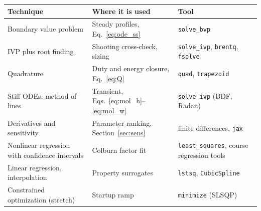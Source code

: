\documentclass[11pt]{article}
\begin{document}
\begin{center}
\small
\begin{tabular}{p{4.6cm} p{5.4cm} p{4.6cm}}
\toprule
Technique & Where it is used & Tool \\
\midrule
Boundary value problem & Steady profiles, Eq.~\eqref{eq:ode_ss} & \texttt{solve\_bvp} \\
IVP plus root finding & Shooting cross-check, sizing & \texttt{solve\_ivp}, \texttt{brentq}, \texttt{fsolve} \\
Quadrature & Duty and energy closure, Eq.~\eqref{eq:Q} & \texttt{quad}, \texttt{trapezoid} \\
Stiff ODEs, method of lines & Transient, Eqs.~\eqref{eq:mol_h}--\eqref{eq:mol_w} & \texttt{solve\_ivp} (BDF, Radau) \\
Derivatives and sensitivity & Parameter ranking, Section~\ref{sec:sens} & finite differences, \texttt{jax} \\
Nonlinear regression with confidence intervals & Colburn factor fit & \texttt{least\_squares}, course regression tools \\
Linear regression, interpolation & Property surrogates & \texttt{lstsq}, \texttt{CubicSpline} \\
Constrained optimization (stretch) & Startup ramp & \texttt{minimize} (SLSQP) \\
\bottomrule
\end{tabular}
\end{center}
\end{document}
